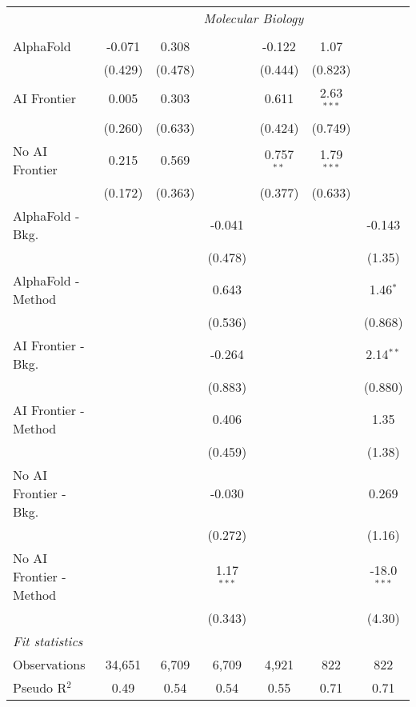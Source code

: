 \begin{tabular}{lcccccc}
 & \multicolumn{6}{c}{\textit{Molecular Biology}} \\ \\
   AlphaFold               & -0.071  & 0.308   &              & -0.122       & 1.07         &   \\   
                           & (0.429) & (0.478) &              & (0.444)      & (0.823)      &   \\   
   AI Frontier             & 0.005   & 0.303   &              & 0.611        & 2.63$^{***}$ &   \\   
                           & (0.260) & (0.633) &              & (0.424)      & (0.749)      &   \\   
   No AI Frontier          & 0.215   & 0.569   &              & 0.757$^{**}$ & 1.79$^{***}$ &   \\   
                           & (0.172) & (0.363) &              & (0.377)      & (0.633)      &   \\   
   AlphaFold - Bkg.        &         &         & -0.041       &              &              & -0.143\\   
                           &         &         & (0.478)      &              &              & (1.35)\\   
   AlphaFold - Method      &         &         & 0.643        &              &              & 1.46$^{*}$\\   
                           &         &         & (0.536)      &              &              & (0.868)\\   
   AI Frontier - Bkg.      &         &         & -0.264       &              &              & 2.14$^{**}$\\   
                           &         &         & (0.883)      &              &              & (0.880)\\   
   AI Frontier - Method    &         &         & 0.406        &              &              & 1.35\\   
                           &         &         & (0.459)      &              &              & (1.38)\\   
   No AI Frontier - Bkg.   &         &         & -0.030       &              &              & 0.269\\   
                           &         &         & (0.272)      &              &              & (1.16)\\   
   No AI Frontier - Method &         &         & 1.17$^{***}$ &              &              & -18.0$^{***}$\\   
                           &         &         & (0.343)      &              &              & (4.30)\\   
   \midrule
   \emph{Fit statistics}\\
   Observations            & 34,651  & 6,709   & 6,709        & 4,921        & 822          & 822\\  
   Pseudo R$^2$            & 0.49    & 0.54    & 0.54         & 0.55         & 0.71         & 0.71\\  
   

\end{tabular}
